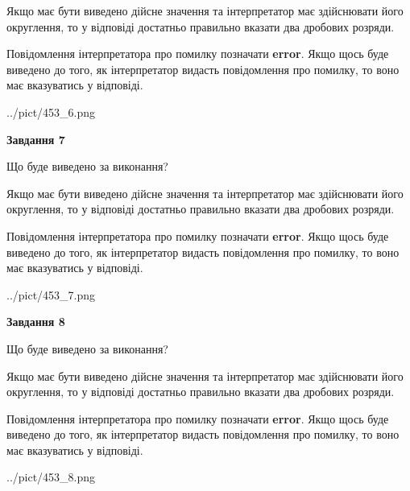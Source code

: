 \documentclass[12pt, ukrainian]{article}
\begin{document}
{\begin {Large}
Якщо має бути виведено дійсне значення та інтерпретатор має здійснювати його округлення, 
то у відповіді достатньо правильно вказати два дробових розряди.

Повідомлення інтерпретатора про помилку позначати \textbf{error}.
Якщо щось буде виведено до того, як інтерпретатор видасть повідомлення про помилку, 
то воно має вказуватись у відповіді. \par

\begin{center}
	{../pict/453_6.png}
\end{center}
\newpage

{\begin {center}\textbf{Завдання 7}\end {center}}\par
Що буде виведено за виконання? \par

Якщо має бути виведено дійсне значення та інтерпретатор має здійснювати його округлення, 
то у відповіді достатньо правильно вказати два дробових розряди.

Повідомлення інтерпретатора про помилку позначати \textbf{error}.
Якщо щось буде виведено до того, як інтерпретатор видасть повідомлення про помилку, 
то воно має вказуватись у відповіді. \par

\begin{center}
	{../pict/453_7.png}
\end{center}
\newpage

{\begin {center}\textbf{Завдання 8}\end {center}}\par
Що буде виведено за виконання? \par

Якщо має бути виведено дійсне значення та інтерпретатор має здійснювати його округлення, 
то у відповіді достатньо правильно вказати два дробових розряди.

Повідомлення інтерпретатора про помилку позначати \textbf{error}.
Якщо щось буде виведено до того, як інтерпретатор видасть повідомлення про помилку, 
то воно має вказуватись у відповіді. \par

\begin{center}
	{../pict/453_8.png}
\end{center}
\newpage


\end{Large}}
\end{document}
